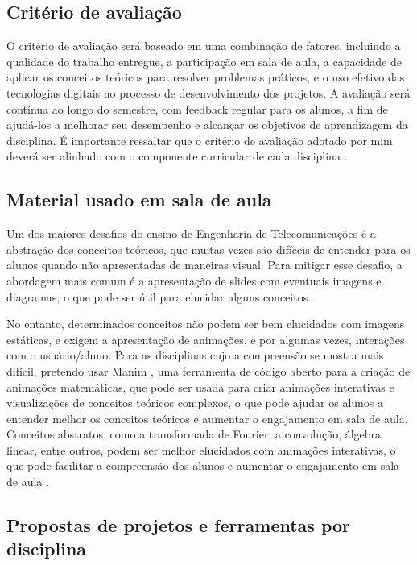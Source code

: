 \documentclass{article}
\begin{document}
\subsection{Critério de avaliação}

O critério de avaliação será baseado em uma combinação de fatores, incluindo a qualidade do trabalho entregue, a participação em sala de aula, a capacidade de aplicar os conceitos teóricos para resolver problemas práticos, e o uso efetivo das tecnologias digitais no processo de desenvolvimento dos projetos. A avaliação será contínua ao longo do semestre, com feedback regular para os alunos, a fim de ajudá-los a melhorar seu desempenho e alcançar os objetivos de aprendizagem da disciplina. É importante ressaltar que o critério de avaliação adotado por mim deverá ser alinhado com o componente curricular de cada disciplina \cite{ufrn_ppc_telecom_2024}.

\subsection{Material usado em sala de aula}

Um dos maiores desafios do ensino de Engenharia de Telecomunicações é a abstração dos conceitos teóricos, que muitas vezes são difíceis de entender para os alunos quando não apresentadas de maneiras visual. Para mitigar esse desafio, a abordagem mais comum é a apresentação de slides com eventuais imagens e diagramas, o que pode ser útil para elucidar alguns conceitos.

No entanto, determinados conceitos não podem ser bem elucidados com imagens estáticas, e exigem a apresentação de animações, e por algumas vezes, interações com o usuário/aluno. Para as disciplinas cujo a compreensão se mostra mais difícil, pretendo usar Manim \cite{zhang2025manimstemeducationvisualizing}, uma ferramenta de código aberto para a criação de animações matemáticas, que pode ser usada para criar animações interativas e visualizações de conceitos teóricos complexos, o que pode ajudar os alunos a entender melhor os conceitos teóricos e aumentar o engajamento em sala de aula. Conceitos abstratos, como a transformada de Fourier, a convolução, álgebra linear, entre outros, podem ser melhor elucidados com animações interativas, o que pode facilitar a compreensão dos alunos e aumentar o engajamento em sala de aula \cite{fiori2025objetos}.

\subsection{Propostas de projetos e ferramentas por disciplina}
\end{document}
